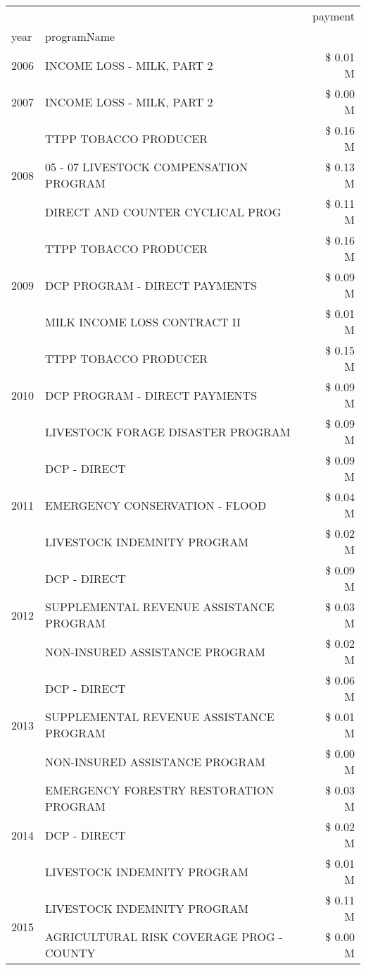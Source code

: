 \begin{tabular}{llr}
\toprule
 &  & payment \\
year & programName &  \\
\midrule
2006 & INCOME LOSS - MILK, PART 2 & \$ 0.01 M \\
\cline{1-3}
2007 & INCOME LOSS - MILK, PART 2 & \$ 0.00 M \\
\cline{1-3}
\multirow[t]{3}{*}{2008} & TTPP TOBACCO PRODUCER & \$ 0.16 M \\
 & 05 - 07 LIVESTOCK COMPENSATION PROGRAM & \$ 0.13 M \\
 & DIRECT AND COUNTER CYCLICAL PROG & \$ 0.11 M \\
\cline{1-3}
\multirow[t]{3}{*}{2009} & TTPP TOBACCO PRODUCER & \$ 0.16 M \\
 & DCP PROGRAM - DIRECT PAYMENTS & \$ 0.09 M \\
 & MILK INCOME LOSS CONTRACT II & \$ 0.01 M \\
\cline{1-3}
\multirow[t]{3}{*}{2010} & TTPP TOBACCO PRODUCER & \$ 0.15 M \\
 & DCP PROGRAM - DIRECT PAYMENTS & \$ 0.09 M \\
 & LIVESTOCK FORAGE DISASTER  PROGRAM & \$ 0.09 M \\
\cline{1-3}
\multirow[t]{3}{*}{2011} & DCP - DIRECT & \$ 0.09 M \\
 & EMERGENCY CONSERVATION - FLOOD & \$ 0.04 M \\
 & LIVESTOCK INDEMNITY PROGRAM & \$ 0.02 M \\
\cline{1-3}
\multirow[t]{3}{*}{2012} & DCP - DIRECT & \$ 0.09 M \\
 & SUPPLEMENTAL REVENUE ASSISTANCE PROGRAM & \$ 0.03 M \\
 & NON-INSURED ASSISTANCE PROGRAM & \$ 0.02 M \\
\cline{1-3}
\multirow[t]{3}{*}{2013} & DCP - DIRECT & \$ 0.06 M \\
 & SUPPLEMENTAL REVENUE ASSISTANCE PROGRAM & \$ 0.01 M \\
 & NON-INSURED ASSISTANCE PROGRAM & \$ 0.00 M \\
\cline{1-3}
\multirow[t]{3}{*}{2014} & EMERGENCY FORESTRY RESTORATION PROGRAM & \$ 0.03 M \\
 & DCP - DIRECT & \$ 0.02 M \\
 & LIVESTOCK INDEMNITY PROGRAM & \$ 0.01 M \\
\cline{1-3}
\multirow[t]{3}{*}{2015} & LIVESTOCK INDEMNITY PROGRAM & \$ 0.11 M \\
 & AGRICULTURAL RISK COVERAGE PROG - COUNTY & \$ 0.00 M \\

\end{tabular}

